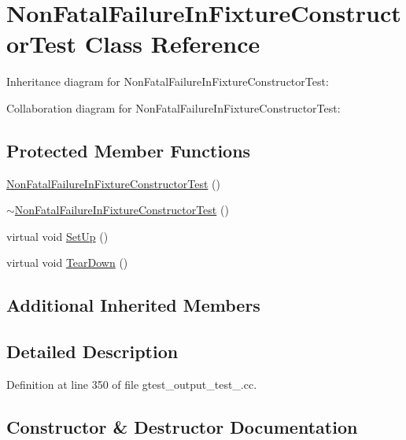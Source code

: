 \hypertarget{class_non_fatal_failure_in_fixture_constructor_test}{}\section{Non\+Fatal\+Failure\+In\+Fixture\+Constructor\+Test Class Reference}
\label{class_non_fatal_failure_in_fixture_constructor_test}


Inheritance diagram for Non\+Fatal\+Failure\+In\+Fixture\+Constructor\+Test\+:


Collaboration diagram for Non\+Fatal\+Failure\+In\+Fixture\+Constructor\+Test\+:
\subsection*{Protected Member Functions}
\begin{DoxyCompactItemize}
\item 
\hyperlink{class_non_fatal_failure_in_fixture_constructor_test_a87a70e2b18b981c627c43f2af85a9345}{Non\+Fatal\+Failure\+In\+Fixture\+Constructor\+Test} ()
\item 
\hyperlink{class_non_fatal_failure_in_fixture_constructor_test_a732fa961c4bb68b3390e4a49a8375619}{$\sim$\+Non\+Fatal\+Failure\+In\+Fixture\+Constructor\+Test} ()
\item 
virtual void \hyperlink{class_non_fatal_failure_in_fixture_constructor_test_a7d951f8fbf7b2ac5046be8d8ee7b03d3}{Set\+Up} ()
\item 
virtual void \hyperlink{class_non_fatal_failure_in_fixture_constructor_test_ab76d79c346d9a378d625fde5739e8ad6}{Tear\+Down} ()
\end{DoxyCompactItemize}
\subsection*{Additional Inherited Members}


\subsection{Detailed Description}


Definition at line 350 of file gtest\+\_\+output\+\_\+test\+\_\+.\+cc.



\subsection{Constructor \& Destructor Documentation}

